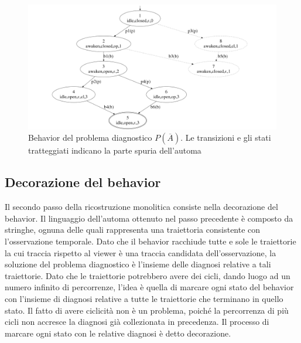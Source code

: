 \begin{figure}[htbp]
\centering
\includegraphics[scale=0.2]{./Img/sa/bhv_s.png}
\caption{Behavior del problema diagnostico $P(\overline{A})$. Le transizioni e gli stati tratteggiati indicano la parte spuria dell'automa}
\label{fig:bhv}
\end{figure}

\subsection{Decorazione del behavior}
Il secondo passo della ricostruzione monolitica consiste nella decorazione del behavior. Il linguaggio dell'automa ottenuto nel passo precedente è composto da stringhe, ognuna delle quali rappresenta una traiettoria consistente con l'osservazione temporale. Dato che il behavior racchiude tutte e sole le traiettorie la cui traccia rispetto al viewer è una traccia candidata dell'osservazione, la soluzione del problema diagnostico è l'insieme delle diagnosi relative a tali traiettorie. Dato che le traiettorie potrebbero avere dei cicli, dando luogo ad un numero infinito di percorrenze, l'idea è quella di marcare ogni stato del behavior con l'insieme di diagnosi relative a tutte le traiettorie che terminano in quello stato. Il fatto di avere ciclicità non è un problema, poiché la percorrenza di più cicli non accresce la diagnosi già collezionata in precedenza. Il processo di marcare ogni stato con le relative diagnosi è detto decorazione.

